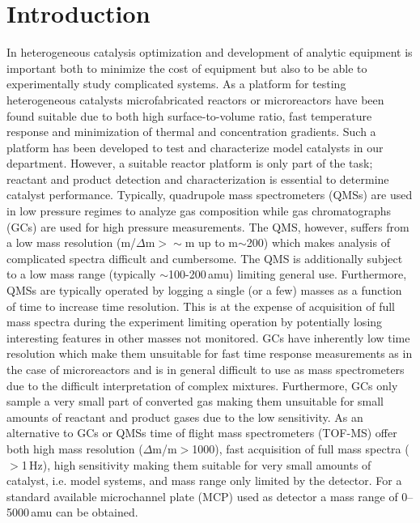 \documentclass[aip,rsi]{revtex4-1}
\begin{document}
\pacs{}%

\maketitle %

\section{Introduction}
In heterogeneous catalysis optimization and development of analytic equipment is important both to minimize the cost of equipment but also to be able to experimentally study complicated systems. As a platform for testing heterogeneous catalysts microfabricated reactors or microreactors have been found suitable due to both high surface-to-volume ratio, fast temperature response and minimization of thermal and concentration gradients\cite{Jensen2001,Jaehnisch2004}. Such a platform has been developed to test and characterize model catalysts in our department\cite{Henriksen2009}. However, a suitable reactor platform is only part of the task; reactant and product detection and characterization is essential to determine catalyst performance. Typically, quadrupole mass spectrometers (QMSs) are used in low pressure regimes to analyze gas composition while gas chromatographs (GCs) are used for high pressure measurements. The QMS, however, suffers from a low mass resolution (m/$\Delta$m$>\sim$m up to m$\sim$200) which makes analysis of complicated spectra difficult and cumbersome. The QMS is additionally subject to a low mass range (typically $\sim$100-200\,amu) limiting general use. Furthermore, QMSs are typically operated by logging a single (or a few) masses as a function of time to increase time resolution. This is at the expense of acquisition of full mass spectra during the experiment limiting operation by potentially losing interesting features in other masses not monitored. GCs have inherently low time resolution which make them unsuitable for fast time response measurements as in the case of microreactors and is in general difficult to use as mass spectrometers due to the difficult interpretation of complex mixtures. Furthermore, GCs only sample a very small part of converted gas making them unsuitable for small amounts of reactant and product gases due to the low sensitivity. As an alternative to GCs or QMSs time of flight mass spectrometers (TOF-MS) offer both high mass resolution ($\Delta$m/m$>$1000), fast acquisition of full mass spectra ($>$1\,Hz), high sensitivity making them suitable for very small amounts of catalyst, i.e. model systems, and mass range only limited by the detector. For a standard available microchannel plate (MCP) used as detector a mass range of 0--5000\,amu can be obtained. 
\end{document}
